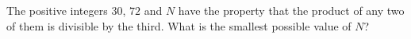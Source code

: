 The positive integers $30$, $72$ and $N$ have the property that the product of any two of them is divisible by the third. What is the smallest possible value of $N$?
